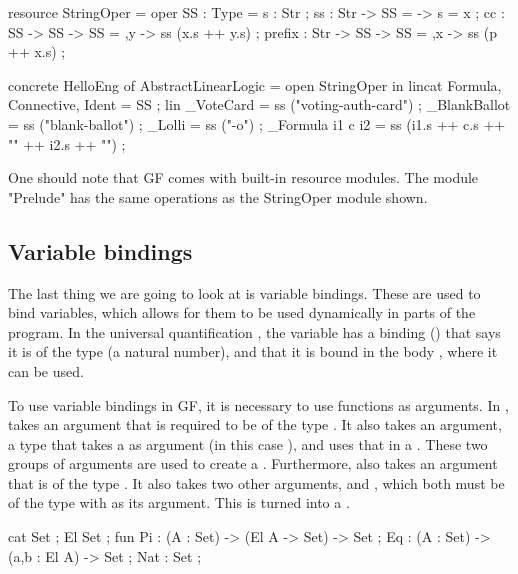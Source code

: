 \begin{lstgf}
resource StringOper = {
    oper
        SS : Type = {s : Str} ;
        ss : Str -> SS = \x -> {s = x} ;
        cc : SS -> SS -> SS = \x,y -> ss (x.s ++ y.s) ;
        prefix : Str -> SS -> SS = \p,x -> ss (p ++ x.s) ;
}
\end{lstgf}

\begin{lstgf}
concrete HelloEng of AbstractLinearLogic = open StringOper in {
    lincat 
        Formula, Connective, Ident = SS ;
    lin 
        _VoteCard = ss ("voting-auth-card") ;
        _BlankBallot = ss ("blank-ballot") ;
        _Lolli = ss ("-o") ;
        _Formula i1 c i2 = ss (i1.s ++ c.s ++ "{" ++ i2.s ++ "}") ;
}
\end{lstgf}

One should note that GF comes with built-in resource modules. The module "Prelude" has the same operations as the StringOper module shown.

\subsection{Variable bindings}
\label{03_02_04}

The last thing we are going to look at is variable bindings. These are used to bind variables, which allows for them to be used dynamically in parts of the program. In the universal quantification , the variable  has a binding () that says it is of the type  (a natural number), and that it is bound in the body , where it can be used.

To use variable bindings in GF, it is necessary to use functions as arguments. In ,  takes an argument  that is required to be of the type . It also takes an  argument, a type that takes a  as argument (in this case ), and uses that in a . These two groups of arguments are used to create a . Furthermore,  also takes an argument  that is of the type . It also takes two other arguments,  and , which both must be of the type  with  as its argument. This is turned into a .


\begin{lstgf}
    cat
        Set ;
        El Set ;
    fun
        Pi : (A : Set) -> (El A -> Set) -> Set ;
        Eq : (A : Set) -> (a,b : El A) -> Set ;
        Nat : Set ;
\end{lstgf}

